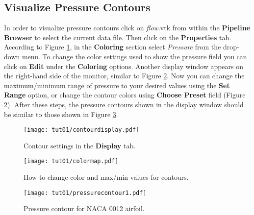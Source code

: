 \subsection{Visualize Pressure Contours}
In order to visualize pressure contours click on \textit{flow}.vtk from within the \textbf{Pipeline Browser} to select the current data file. Then click on the \textbf{Properties} tab. According to Figure \ref{fig1:colorby}, in the \textbf{Coloring} section select \textit{Pressure} from the drop-down menu. To change the color settings used to show the pressure field you can click on \textbf{Edit} under the \textbf{Coloring} options. Another display window appears on the right-hand side of the monitor, similar to Figure \ref{fig1:change_color_range}. Now you can change the maximum/minimum range of pressure to your desired values using the \textbf{Set Range} option, or change the contour colors using \textbf{Choose Preset} field (Figure \ref{fig1:change_color_range}). After these steps, the pressure contours shown in the display window should be similar to those shown in Figure \ref{fig1:pressure_contour}.
\begin{figure}[htbp]
    \centering
    \texttt{[image: tut01/contourdisplay.pdf]}
    \caption{Contour settings in the \textbf{Display} tab.}
    \label{fig1:colorby}
\end{figure}
\begin{figure}[htbp]
    \centering
    \texttt{[image: tut01/colormap.pdf]}
    \caption{How to change color and max/min values for contours.}
    \label{fig1:change_color_range}
\end{figure}
\begin{figure}[htbp]
    \centering
    \texttt{[image: tut01/pressurecontour1.pdf]}
    \caption{Pressure contour for NACA 0012 airfoil.}
    \label{fig1:pressure_contour}
\end{figure}

